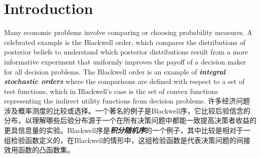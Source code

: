 \documentclass[12pt,letterpaper]{article}
\newenvironment{original}{\color{black}}{}
\newenvironment{translation}{\color{blue}}{}
\theoremstyle{plain}
\theoremstyle{definition}
\theoremstyle{remark}
\theoremstyle{definition}
\begin{document}
\setcounter{page}{1}
\newpage

\newpage

\section{Introduction}

\begin{original}
Many economic problems involve comparing or choosing probability measures. A celebrated example is the Blackwell order, which compares the distributions of posterior beliefs to understand which posterior distributions result from a more informative experiment that uniformly improves the payoff of a decision maker for all decision problems. The Blackwell order is an example of \textit{\textbf{integral stochastic orders}} where the comparisons are defined with respect to a set of test functions, which in Blackwell's case is the set of convex functions representing the indirect utility functions from decision problems.
\end{original}
\begin{translation}
许多经济问题涉及概率测度的比较或选择。一个著名的例子是Blackwell序，它比较后验信念的分布，以理解哪些后验分布源于一个在所有决策问题中都能一致提高决策者收益的更具信息量的实验。Blackwell序是\textit{\textbf{积分随机序}}的一个例子，其中比较是相对于一组检验函数定义的，在Blackwell的情形中，这组检验函数是代表决策问题的间接效用函数的凸函数集。
\end{translation}
\end{document}
